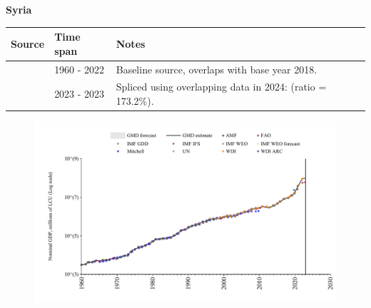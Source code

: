 \documentclass[12pt,a4paper,landscape]{article}
\begin{document}
\begin{adjustbox}{max totalsize={\paperwidth}{\paperheight},center}
\begin{minipage}[t][\textheight][t]{\textwidth}
\vspace*{0.5cm}
{}
\begin{center}
{\Large\bfseries Syria}
\end{center}
\vspace{0.5cm}
\begin{table}[H]
\centering
\small
\begin{tabular}{|l|l|l|}
\hline
\textbf{Source} & \textbf{Time span} & \textbf{Notes} \\
\hline
\rowcolor{white}\cite{WDI}& 1960 - 2022 &Baseline source, overlaps with base year 2018.\\
\rowcolor{lightgray}\cite{FAO}& 2023 - 2023 &Spliced using overlapping data in 2024: (ratio = 173.2\%).\\
\hline
\end{tabular}
\end{table}
\begin{figure}[H]
\centering
\includegraphics[width=\textwidth,height=0.6\textheight,keepaspectratio]{graphs/SYR_nGDP.pdf}
\end{figure}
\end{minipage}
\end{adjustbox}
\end{document}
